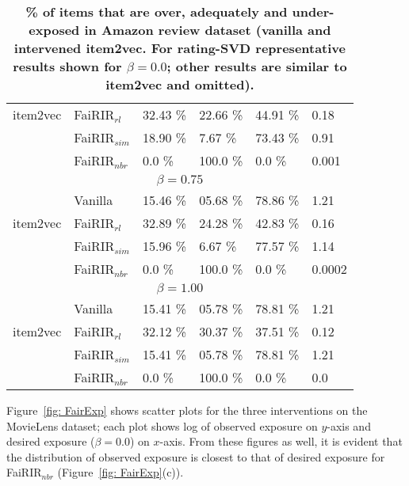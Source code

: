 \begin{table}[tb]
\begin{tabular}{|p{1cm}|p{1.2cm}||p{1.0cm}|p{1.0 cm}|p{1.0cm}||p{1.0 cm}| }
		item2vec& FaiRIR$_{rl}$ 	& 32.43 \%& 22.66 \% & 44.91 \% & 0.18  \\ \cline{2-6}
		& FaiRIR$_{sim}$	& 18.90 \%& 7.67 \% & 73.43 \% & 0.91  \\ \cline{2-6}
		& FaiRIR$_{nbr}$	& 0.0 \% & 100.0 \% & 0.0 \% & 0.001  \\ 
		\hline
		\multicolumn{6}{|c|}{\bf $\beta = 0.75$}\\
		\hline 
		& Vanilla 		& 15.46 \%& 05.68 \% & 78.86 \% & 1.21  \\ \cline{2-6}
		item2vec& FaiRIR$_{rl}$ 	& 32.89 \%& 24.28 \% & 42.83 \% & 0.16  \\ \cline{2-6}
		& FaiRIR$_{sim}$	& 15.96 \%& 6.67 \% & 77.57 \% & 1.14  \\ \cline{2-6}
		& FaiRIR$_{nbr}$	& 0.0 \% & 100.0 \% & 0.0 \% & 0.0002  \\ 
		\hline
		\multicolumn{6}{|c|}{\bf $\beta = 1.00$}\\
		\hline 
		& Vanilla 		& 15.41 \%& 05.78 \% & 78.81 \% & 1.21  \\ \cline{2-6}
		item2vec& FaiRIR$_{rl}$ 	& 32.12 \%& 30.37 \% & 37.51 \% & 0.12  \\ \cline{2-6}
		& FaiRIR$_{sim}$	& 15.41 \%& 05.78 \% & 78.81 \% & 1.21  \\ \cline{2-6}
		& FaiRIR$_{nbr}$	& 0.0 \% & 100.0 \% & 0.0 \% & 0.0  \\ 
		\hline
	\end{tabular}
	\caption{{\bf \% of items that are over, adequately and under-exposed in Amazon review dataset (vanilla and intervened item2vec. For rating-SVD representative results shown for $\beta=0.0$; other results are similar to item2vec and omitted).}}
	\label{Tab: Amazon}
	\vspace{-6 mm}
\end{table}

\noindent Figure~\ref{fig: FairExp} shows scatter plots for the three interventions on the MovieLens dataset; each plot shows log of observed exposure on $y$-axis and desired exposure ($\beta = 0.0$) on $x$-axis. From these figures as well, it is evident that the distribution of observed exposure is closest to that of desired exposure for FaiRIR$_{nbr}$ (Figure~\ref{fig: FairExp}(c)).

